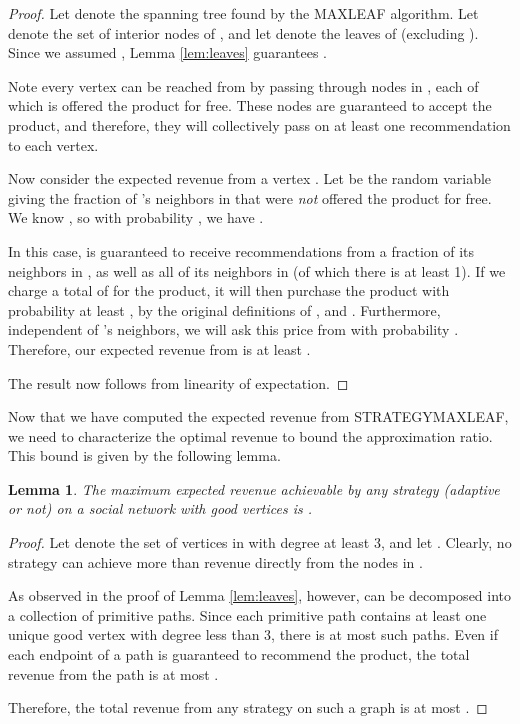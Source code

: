 \documentclass[letterpaper,twoside]{article}
\newtheorem{lemma}{Lemma}
\newcommand{\maxleaf}{\textrm{M{\scriptsize AX}\-L{\scriptsize EAF}}}
\newcommand{\strategyml}{\textrm{S{\scriptsize TRATEGY}\-M{\scriptsize AX}\-L{\scriptsize EAF}}}
\begin{document}
\begin{proof}
  Let  denote the spanning tree found by the \maxleaf{}
  algorithm. Let  denote the set of interior nodes of , and
  let  denote the leaves of  (excluding ). Since we
  assumed , Lemma \ref{lem:leaves} guarantees .

  Note every vertex can be reached from  by passing through
  nodes in , each of which is offered the product for free. These
  nodes are guaranteed to accept the product, and therefore, they
  will collectively pass on at least one recommendation to each vertex.

  Now consider the expected revenue from a vertex . Let 
  be the random variable giving the fraction of 's neighbors in
   that were {\em not} offered the product for free. We know
  , so with probability , we have
  .

  In this case,  is guaranteed to receive recommendations from a
  fraction  of its neighbors in , as well as all of its
  neighbors in  (of which there is at least 1). If we
  charge  a total of  for the product, it will then purchase
  the product with probability at least , by the original definitions
  of ,  and . Furthermore,
  independent of 's neighbors, we will ask this price from 
  with probability . Therefore, our expected revenue
  from  is at least .

  The result now follows from linearity of expectation.
\end{proof}

Now that we have computed the expected revenue from \strategyml, we need to
characterize the optimal revenue to bound the approximation ratio. This bound
is given by the following lemma.
\begin{lemma} \label{lem:optbound}
The maximum expected revenue achievable by any strategy (adaptive or
not) on a social network  with  good vertices is .
\end{lemma}
\begin{proof}
  Let  denote the set of vertices in  with degree at least 3,
  and let . Clearly, no strategy can achieve more than
   revenue directly from the nodes in .

  As observed in the proof of Lemma \ref{lem:leaves}, however,
   can be decomposed into a collection of primitive paths. Since
  each primitive path contains at least one unique good vertex with
  degree less than 3, there is at most  such paths. Even if
  each endpoint of a path is guaranteed to recommend the product,
  the total revenue from the path is at most .

  Therefore, the total revenue from any strategy on such a graph is at
  most .
\end{proof}
\end{document}
